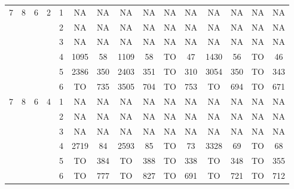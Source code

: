 \begin{longtable}{|c|c|c|c|c|c c|c c|c c|c c|c c|}
\hline
\multirow{6}{*}{7} & \multirow{6}{*}{8} & \multirow{6}{*}{6} & \multirow{6}{*}{2} & 1 & NA & NA & NA & NA & NA & NA & NA & NA & NA & NA \\
 & & & & 2 & NA & NA & NA & NA & NA & NA & NA & NA & NA & NA \\
 & & & & 3 & NA & NA & NA & NA & NA & NA & NA & NA & NA & NA \\
 & & & & 4 & 1095 & 58 & 1109 & 58 & TO & 47 & 1430 & 56 & TO & 46 \\
 & & & & 5 & 2386 & 350 & 2403 & 351 & TO & 310 & 3054 & 350 & TO & 343 \\
 & & & & 6 & TO & 735 & 3505 & 704 & TO & 753 & TO & 694 & TO & 671 \\
\hline
\multirow{6}{*}{7} & \multirow{6}{*}{8} & \multirow{6}{*}{6} & \multirow{6}{*}{4} & 1 & NA & NA & NA & NA & NA & NA & NA & NA & NA & NA \\
 & & & & 2 & NA & NA & NA & NA & NA & NA & NA & NA & NA & NA \\
 & & & & 3 & NA & NA & NA & NA & NA & NA & NA & NA & NA & NA \\
 & & & & 4 & 2719 & 84 & 2593 & 85 & TO & 73 & 3328 & 69 & TO & 68 \\
 & & & & 5 & TO & 384 & TO & 388 & TO & 338 & TO & 348 & TO & 355 \\
 & & & & 6 & TO & 777 & TO & 827 & TO & 691 & TO & 721 & TO & 712 \\
\hline
\end{longtable}
